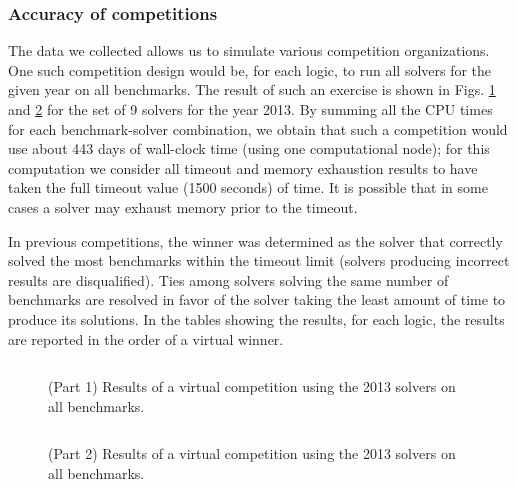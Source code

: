 \documentclass[smallcondensed]{svjour3}
\begin{document}
\subsubsection{Accuracy of competitions}
\label{BenchmarkSelection}
The data we collected allows us to simulate various competition organizations. One such competition design would be, for each logic, to run all solvers for the given year on all benchmarks. The result of such an exercise is shown in Figs. \ref{Fig:virtual-competition-all} and \ref{Fig:virtual-competition-all2} for the set of 9 solvers for the year 2013. By summing all the CPU times for each benchmark-solver combination, we obtain that such a competition would use about 443 days of wall-clock time (using one computational node); for this computation we consider all timeout and memory exhaustion results to have taken the full timeout value (1500 seconds) of time. It is possible that in some cases a solver may exhaust memory prior to the timeout.

In previous competitions, the winner was determined as the solver that correctly solved the most benchmarks within the timeout limit (solvers producing incorrect results are disqualified). Ties among solvers solving the same number of benchmarks are resolved in favor of the solver taking the least amount of time to produce its solutions. In the tables showing the results, for each logic, the results are reported in the order of a virtual winner.

\begin{figure}
\centering
\begin{tabular}{|p{.01in}rrl|}
\hline

\end{tabular}
\caption{(Part 1) Results of a virtual competition using the 2013 solvers on all benchmarks.}
\label{Fig:virtual-competition-all}
\end{figure}

\begin{figure}
\centering
\begin{tabular}{|p{.01in}rrl|}
\hline

\end{tabular}
\caption{(Part 2) Results of a virtual competition using the 2013 solvers on all benchmarks.}
\label{Fig:virtual-competition-all2}
\end{figure}

%
\end{document}
